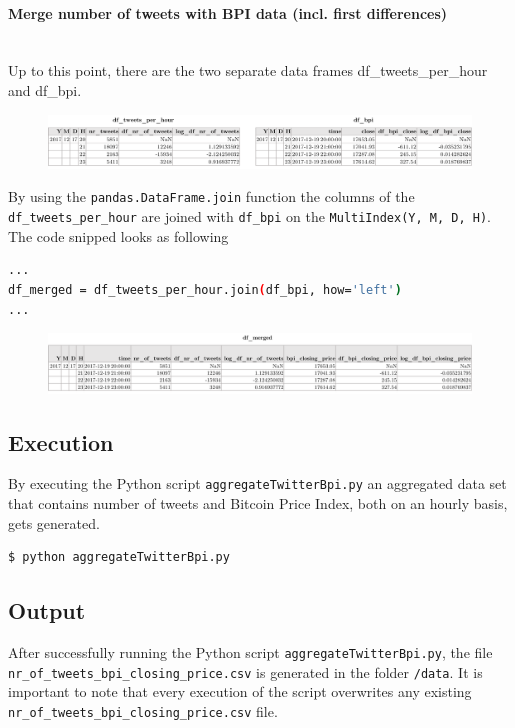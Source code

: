 \documentclass[a4paper,12pt]{article}
\begin{document}
\begin{spacing}{1.2}
\paragraph{Merge number of tweets with BPI data (incl. first differences)}\mbox{}\\
Up to this point, there are the two separate data frames df\_tweets\_per\_hour and df\_bpi.

\begin{figure}[H]
    \centering
    \includegraphics[scale=0.52]{dfseperate.png}
\end{figure}
By using the \verb|pandas.DataFrame.join| function the columns of the  \verb|df_tweets_per_hour| are joined with  \verb|df_bpi| on the  \verb|MultiIndex(Y, M, D, H)|. The code snipped looks as following\:
\begin{lstlisting}[language=bash]
...
df_merged = df_tweets_per_hour.join(df_bpi, how='left')
...
\end{lstlisting}
\begin{figure}[H]
    \centering
    \includegraphics[scale=0.52]{dfmerged.png}
\end{figure}

\subsection{Execution}
By executing the Python script \verb|aggregateTwitterBpi.py| an aggregated data set that contains number of tweets and Bitcoin Price Index, both on an hourly basis, gets generated. 
\begin{lstlisting}[language=bash]
    $ python aggregateTwitterBpi.py
\end{lstlisting}

\subsection{Output}
After successfully running the Python script \verb|aggregateTwitterBpi.py|, the file \verb|nr_of_tweets_bpi_closing_price.csv| is generated in the folder \verb|/data|. It is important to note that every execution of the script overwrites any existing \verb|nr_of_tweets_bpi_closing_price.csv| file.


\end{spacing}
\end{document}
